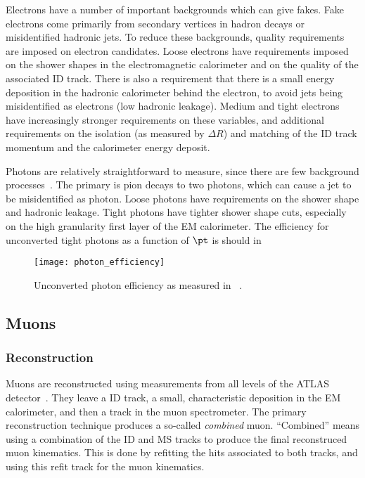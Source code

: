 Electrons have a number of important backgrounds which can give fakes.
Fake electrons come primarily from secondary vertices in hadron decays or misidentified hadronic jets.
To reduce these backgrounds, quality requirements are imposed on electron candidates.
Loose electrons have requirements imposed on the shower shapes in the electromagnetic calorimeter and on the quality of the associated ID track.
There is also a requirement that there is a small energy deposition in the hadronic calorimeter behind the electron, to avoid jets being misidentified as electrons (low hadronic leakage).
Medium and tight electrons have increasingly stronger requirements on these variables, and additional requirements on the isolation (as measured by $\Delta R$) and matching of the ID track momentum and the calorimeter energy deposit.

Photons are relatively straightforward to measure, since there are few background processes~\cite{ATL-PHYS-PUB-2016-015}.
The primary is pion decays to two photons, which can cause a jet to be misidentified as photon.
Loose photons have requirements on the shower shape and hadronic leakage.
Tight photons have tighter shower shape cuts, especially on the high granularity first layer of the EM calorimeter.
The efficiency for unconverted tight photons as a function of $\pt$ is should in
\begin{figure}
\caption{Unconverted photon efficiency as measured in ~\cite{ATL-PHYS-PUB-2016-015}.} \label{fig:photon_eff}
\texttt{[image: photon\_efficiency]}
\end{figure}

\subsection{Muons}

\subsubsection{Reconstruction}

Muons are reconstructed using measurements from all levels of the ATLAS detector~\cite{PERF-2015-10}.
They leave a ID track, a small, characteristic deposition in the EM calorimeter, and then a track in the muon spectrometer.
The primary reconstruction technique produces a so-called \textit{combined} muon.
``Combined'' means using a combination of the ID and MS tracks to produce the final reconstruced muon kinematics.
This is done by refitting the hits associated to both tracks, and using this refit track for the muon kinematics.

